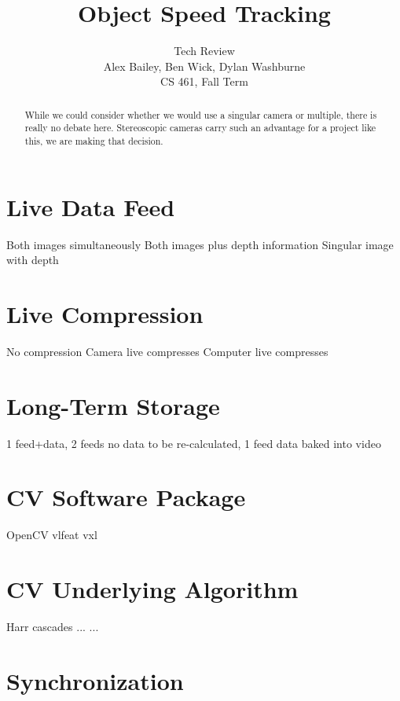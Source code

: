 \documentclass[letterpaper,10pt,onecolumn,draftclsnofoot]{IEEEtran}
\title{Object Speed Tracking}
\author{Tech Review\\Alex Bailey, Ben Wick, Dylan Washburne\\CS 461, Fall Term}
\begin{document}
\begin{titlepage}

\maketitle

\begin{abstract}
While we could consider whether we would use a singular camera or multiple, there is really no debate here.
Stereoscopic cameras carry such an advantage for a project like this, we are making that decision.
 
\end{abstract}

\end{titlepage}

\section{Live Data Feed}

Both images simultaneously
Both images plus depth information
Singular image with depth

\section{Live Compression}

No compression
Camera live compresses
Computer live compresses

\section{Long-Term Storage}

1 feed+data, 
2 feeds no data to be re-calculated, 
1 feed data baked into video

\section{CV Software Package}

OpenCV
vlfeat
vxl

\section{CV Underlying Algorithm}

Harr cascades
...
...

\section{Synchronization}
\end{document}
